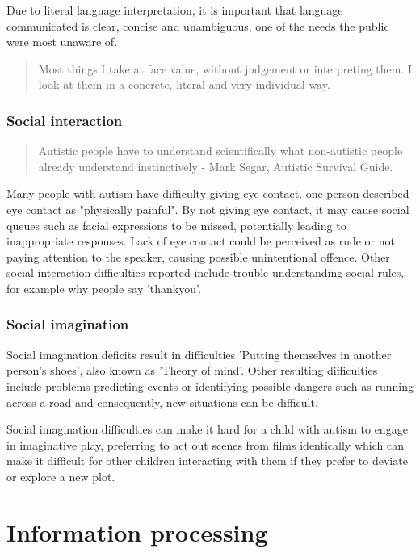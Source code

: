 \documentclass[11pt]{report}
\begin{document}
Due to literal language interpretation, it is important that language communicated is clear, concise and unambiguous, one of the needs the public were most unaware of\cite{autismmisconception}.

\begin{quote}
Most things I take at face value, without judgement or interpreting them. I look at them in a concrete, literal and very individual way. \cite{olgab}
\end{quote}

\subsubsection*{Social interaction}

\begin{quote}
Autistic people have to understand scientifically what non-autistic people already understand instinctively 
- Mark Segar, Autistic Survival Guide.
\end{quote}

Many people with autism have difficulty giving eye contact, one person described eye contact as "physically painful". By not giving eye contact, it may cause social queues such as facial expressions to be missed, potentially leading to inappropriate responses. Lack of eye contact could be perceived as rude or not paying attention to the speaker, causing possible unintentional offence. Other social interaction difficulties reported include trouble understanding social rules\cite{nas}, for example why people say 'thankyou'.

\subsubsection*{Social imagination}
Social imagination deficits result in difficulties 'Putting themselves in another person's shoes', also known as 'Theory of mind'. Other resulting difficulties include problems predicting events or identifying possible dangers such as running across a road and consequently, new situations can be difficult.\cite{nas}

Social imagination difficulties can make it hard for a child with autism to engage in imaginative play, preferring to act out scenes from films identically which can make it difficult for other children interacting with them if they prefer to deviate or explore a new plot.\cite{nas}

\section{Information processing}
\end{document}
